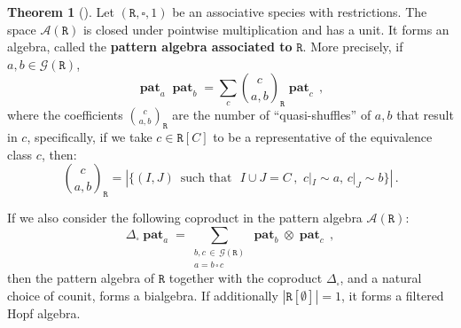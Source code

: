 \documentclass[submission]{FPSAC2023}
\theoremstyle{definition}
\newtheorem{thm}{Theorem}[section]
\newtheorem{defin}[thm]{Definition}
\DeclareMathOperator{\pat}{\mathbf{pat}}
\newcommand{\prR}{\mathtt{R}}
\newcommand{\Kc}{\mathcal{K}}
\newcommand{\Kcb}{\overline{\Kc}}
\newcommand{\sq}{{{\scriptstyle{\square}}}}
\begin{document}

\begin{thm}[\cite{Penaguiao2020}]
Let $(\prR, \sq, 1) $ be an associative species with restrictions. The space $\mathcal{A}(\prR)$ is closed under pointwise multiplication and has a unit.
It forms an algebra, called the {\bf pattern algebra associated to} $\prR$.
More precisely, if $a, b \in \mathcal G(\prR)$,
\begin{equation}\label{eq:prodrule}
\pat_ a   \pat_b = \sum_c \binom{c}{a, b}_{\! \prR} \pat_c \, ,
\end{equation}
where the coefficients $\binom{c}{a, b}_{\!\prR}$ are the number of ``quasi-shuffles'' of $a, b$ that result in $c$, specifically, if we take $c\in \prR[C]$ to be a representative of the equivalence class $c$, then:
$$ \binom{c}{a, b}_{\!\prR} = \left| \{(I, J) \, \text{ such that } \, \,  I \cup J = C \, ,\, \, c|_{I} \sim a, \, c|_{J} \sim b \} \right| \, .  $$

If we also consider the following coproduct in the pattern algebra $\mathcal A (\prR)$:
\begin{equation}\label{eq:coprodformula}
\Delta_{\sq} \pat_ a = \sum_{\substack{ b, c \, \in \, \mathcal G (\prR) \\ a = b \, \sq \, c}} \pat_b \otimes \pat_c \, ,
\end{equation}
then the pattern algebra of $\prR$ together with the coproduct $\Delta_{\sq}$, and a natural choice of counit, forms a bialgebra.
If additionally $| \prR[\emptyset ] | = 1 $, it forms a filtered Hopf algebra.
\end{thm} 
\end{document}
